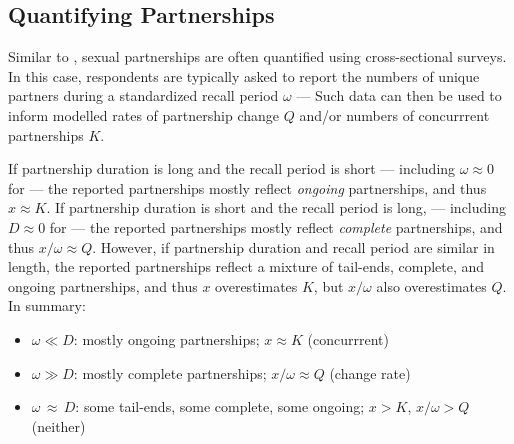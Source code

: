 \subsection{Quantifying Partnerships}\label{app.math.dur.qp}
Similar to ,
sexual partnerships are often quantified using cross-sectional surveys.
In this case, respondents are typically asked to report the numbers of unique partners
during a standardized recall period $\omega$ --- \eg
{}
Such data can then be used to inform modelled
rates of partnership change $Q$ and/or numbers of concurrrent partnerships $K$.
\par
If partnership duration is long and the recall period is short
--- including $\omega \approx 0$ for
 ---
the reported partnerships mostly reflect \emph{ongoing} partnerships,
and thus $x \approx K$.
If partnership duration is short and the recall period is long,
--- including $D \approx 0$ for
 ---
the reported partnerships mostly reflect \emph{complete} partnerships,
and thus $x/\omega \approx Q$.
However, if partnership duration and recall period are similar in length,
the reported partnerships reflect a mixture of tail-ends, complete, and ongoing partnerships,
and thus $x$ overestimates $K$, but $x/\omega$ also overestimates $Q$.
In summary:
\begin{itemize}
  \item $\omega \ll D$: mostly ongoing partnerships;
  $x \approx K$ (concurrrent)
  \item $\omega \gg D$: mostly complete partnerships;
  $x/\omega \approx Q$ (change rate)
  \item $\omega\,\approx\,D$: some tail-ends, some complete, some ongoing;
  $x > K$, $x/\omega > Q$ (neither)
\end{itemize}
